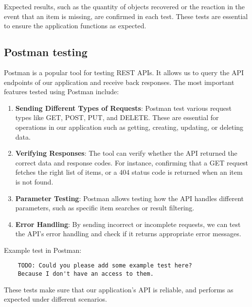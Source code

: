 Expected results, such as the quantity of objects recovered or the reaction in the event that an item is missing, are confirmed in each test. These tests are essential to ensure the application functions as expected.

\subsection{Postman testing}
Postman is a popular tool for testing REST APIs. It allows us to query the API endpoints of our application and receive back responses. The most important features tested using Postman include:

\begin{enumerate}
    \item \textbf{Sending Different Types of Requests}: Postman test various request types like GET, POST, PUT, and DELETE. These are essential for operations in our application such as getting, creating, updating, or deleting data.
    \item \textbf{Verifying Responses}: The tool can verify whether the API returned the correct data and response codes. For instance, confirming that a GET request fetches the right list of items, or a 404 status code is returned when an item is not found.
    \item \textbf{Parameter Testing}: Postman allows testing how the API handles different parameters, such as specific item searches or result filtering.
    \item \textbf{Error Handling}: By sending incorrect or incomplete requests, we can test the API's error handling and check if it returns appropriate error messages.
\end{enumerate}

Example test in Postman:
\begin{verbatim}
    TODO: Could you please add some example test here?
    Because I don't have an access to them.
  \end{verbatim}

These tests make sure that our application's API is reliable, and performs as expected under different scenarios.

